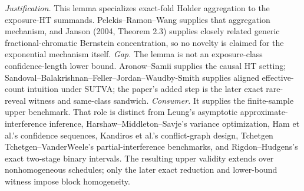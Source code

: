 \documentclass{article}
\begin{document}
\par\smallskip\noindent \textit{Justification.} This lemma specializes exact-fold Holder aggregation to the exposure-HT summands. Pelekis--Ramon--Wang supplies that aggregation mechanism, and Janson (2004, Theorem 2.3) supplies closely related generic fractional-chromatic Bernstein concentration, so no novelty is claimed for the exponential mechanism itself. \textit{Gap.} The lemma is not an exposure-class confidence-length lower bound. Aronow--Samii supplies the causal HT setting; Sandoval--Balakrishnan--Feller--Jordan--Waudby-Smith supplies aligned effective-count intuition under SUTVA; the paper's added step is the later exact rare-reveal witness and same-class sandwich. \textit{Consumer.} It supplies the finite-sample upper benchmark. That role is distinct from Leung's asymptotic approximate-interference inference, Harshaw--Middleton--Savje's variance optimization, Ham et al.'s confidence sequences, Kandiros et al.'s conflict-graph design, Tchetgen Tchetgen--VanderWeele's partial-interference benchmarks, and Rigdon--Hudgens's exact two-stage binary intervals. The resulting upper validity extends over nonhomogeneous schedules; only the later exact reduction and lower-bound witness impose block homogeneity.
\end{document}
